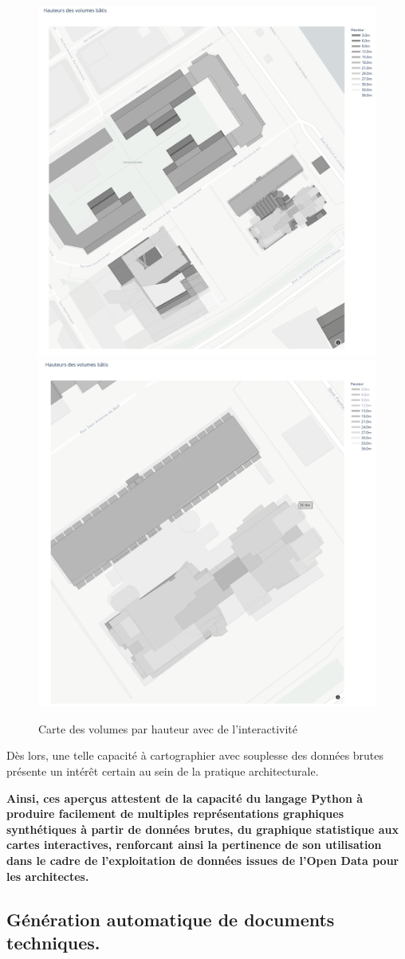 \documentclass[
  11pt,
  french,
]{article}
\begin{document}
\begin{tcolorbox}
\begin{figure}

{\centering \includegraphics[width=0.45\linewidth]{__imgs/carte_hauteurs_1} \includegraphics[width=0.45\linewidth]{__imgs/carte_hauteurs_2} 

}

\caption[Carte des volumes par hauteur avec de l'interactivité  -  Réalisation personnelle]{Carte des volumes par hauteur avec de l'interactivité}\label{fig:carte_inter}
\end{figure}
\end{tcolorbox}

Dès lors, une telle capacité à cartographier avec souplesse des données
brutes présente un intérêt certain au sein de la pratique
architecturale.

\textbf{Ainsi, ces aperçus attestent de la capacité du langage Python à
produire facilement de multiples représentations graphiques synthétiques
à partir de données brutes, du graphique statistique aux cartes
interactives, renforcant ainsi la pertinence de son utilisation dans le
cadre de l'exploitation de données issues de l'Open Data pour les
architectes.}

\newpage

\hypertarget{guxe9nuxe9ration-automatique-de-documents-techniques.}{%
\subsection{Génération automatique de documents
techniques.}\label{guxe9nuxe9ration-automatique-de-documents-techniques.}}
\end{document}
